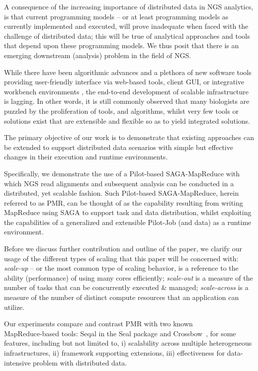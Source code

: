 \documentclass{acm_proc_article-sp}
\begin{document}
A consequence of the increasing importance of distributed data in NGS
analytics, is that current programming models -- or at least
programming models as currently implemented and executed, will prove
inadequate when faced with the challenge of distributed data; this
will be true of analytical approaches and tools that depend upon these
programming models. We thus posit that there is an emerging downstream
(analysis) problem in the field of NGS. 

While there have been algorithmic advances and a plethora of new
software tools providing user-friendly interface via web-based tools, client GUI, or integrative workbench environments \cite{galaxy}, the end-to-end
development of scalable infrastructure is lagging.  In other words,
it is still commonly observed that many biologists are puzzled by the proliferation of tools, and algorithms, whilst very few tools or solutions exist that are
extensible and flexible so as to yield integrated solutions.
 
The primary objective of our work is to demonstrate that existing
approaches can be extended to support distributed data scenarios with
simple but effective changes in their execution and runtime
environments.

Specifically, we demonstrate the use of a Pilot-based SAGA-MapReduce
with which NGS read alignments and subsequent analysis can be
conducted in a distributed, yet scalable fashion. Such Pilot-based
SAGA-MapReduce, herein referred to as PMR, can be thought of as the
capability resulting from writing MapReduce using SAGA to support task
and data distribution, whilst exploiting the capabilities of a
generalized and extensible Pilot-Job (and data) as a runtime
environment\cite{Sehgal2011590,pmr2012,pstar11}.

Before we discuss further contribution and outline of the paper, we
clarify our usage of the different types of scaling that this paper
will be concerned with: {\it scale-up} -- or the most common type of
scaling behavior, is a reference to the ability (performance) of using
many cores efficiently; {\it scale-out} is a measure of the number of
tasks that can be concurrently executed \& managed; {\it scale-across}
is a measure of the number of distinct compute resources that an
application can utilize.

Our experiments compare and contrast PMR with two known\\
MapReduce-based tools: Seqal in the Seal package and
Crossbow~\cite{seal2011,langmead2010}, for some features, including
but not limited to, i) scalability across multiple heterogeneous
infrastructures, ii) framework supporting extensions, iii)
effectiveness for data-intensive problem with distributed data.
\end{document}
